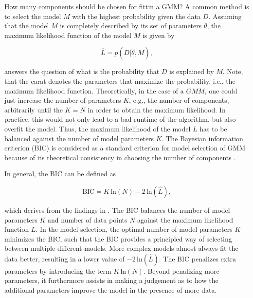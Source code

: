 \documentclass[../../../main.tex]{subfiles}
\begin{document}

How many components should be chosen for fittin a GMM? A common method is to select the model $M$ with the highest probability given the data $D$. Assuming that the model $M$ is completely described by its set of parameters $\theta$, the maximum likelihood function of the model $M$ is given by 

\begin{equation}
    \hat{L} = p(D|\hat{\theta}, M),
\end{equation}
    
answers the question of what is the probability that $D$ is explained by $M$. Note, that the carat denotes the parameters that maximize the probability, i.e., the maximum likelihood function. Theoretically, in the case of a $GMM$, one could just increase the number of parameters $K$, e.g., the number of components, arbitrarily until the $K = N$ in order to obtain the maximum likelihood. In practice, this would not only lead to a bad runtime of the algorithm, but also overfit the model. Thus, the maximum likelihood of the model $L$ has to be balanced against the number of model parameters $K$. The Bayesian information criterion (BIC) is considered as a standard criterion for model selection of GMM because of its theoretical consistency in choosing the number of components \cite{keribin2000consistent}.

In general, the BIC can be defined as

\begin{equation}
    \text{BIC} = K \, \text{ln}(N) - 2 \, \text{ln}(\hat{L}),
\end{equation}

which derives from the findings in \cite{schwarz1978estimating}. The BIC balances the number of model parameters $K$ and number of data points $N$ against the maximum likelihood function $L$. In the model selection, the optimal number of model parameters $K$ minimizes the BIC, such that the BIC provides a principled way of selecting between multiple different models. More complex models almost always fit the data better, resulting in a lower value of $-2 \, \text{ln}(\hat{L})$. The BIC penalizes extra parameters by introducing the term $K \, \text{ln}(N)$. Beyond penalizing more parameters, it furthermore assists in making a judgement as to how the additional parameters improve the model in the presence of more data.
\end{document}

